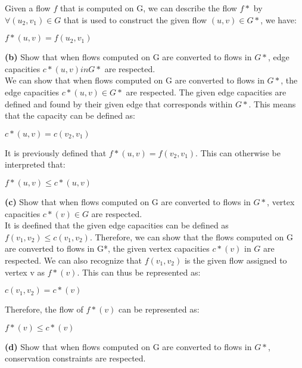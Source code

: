 \documentclass[12pt]{article}
\begin{document}
 Given a flow $f$ that is computed on G, we can describe the flow $f*$ by $\forall(u_2, v_1) \in G$ that is used to construct the given flow $(u,v) \in G*$, we have:
 \begin{center}
 $f*(u,v) = f(u_2,v_1)$ \\
 \end{center}
 \textbf{(b)} Show that when flows computed on G are converted to flows in $G*$, edge capacities $c*(u,v) in G*$ are respected. \\
 \linebreak
 We can show that when flows computed on G are converted to flows in $G*$, the edge capacities $c*(u,v) \in G*$ are respected. The given edge capacities are defined and found by their given edge that corresponds within $G*$. This means that the capacity can be defined as: \\
 \begin{center}
 $c*(u,v) = c(v_2,v_1)$ \\
 \end{center}
 It is previously defined that $f*(u,v) = f(v_2,v_1)$. This can otherwise be interpreted that: \\
 \begin{center}
 $f*(u,v) \leqslant c*(u,v)$ \\
 \end{center}
 \textbf{(c)} Show that when flows computed on G are converted to flows in $G*$, vertex capacities $c*(v) \in G$ are respected. \\
 \linebreak
 It is deefined that the given edge capacities can be defined as $f(v_1,v_2) \leqslant c(v_1,v_2)$. Therefore, we can show that the flows computed on G are converted to flows in G*, the given vertex capacities $c*(v)$ in $G$ are respected. We can also recognize that $f(v_1,v_2)$ is the given flow assigned to vertex v as $f*(v)$. This can thus be represented as: \\
 \begin{center}
 $c(v_1,v_2) = c*(v)$ \\
 \end{center}
 Therefore, the flow of $f*(v)$ can be represented as: \\
 \begin{center}
 $f*(v) \leqslant c*(v)$ \\
 \end{center}
 \textbf{(d)} Show that when flows computed on G are converted to flows in $G*$, conservation constraints are respected.  \\
 \linebreak
 
\end{document}
